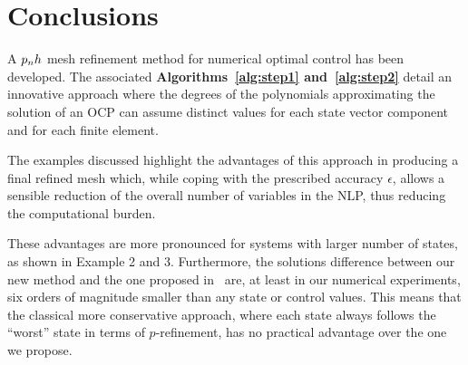 \section*{Conclusions}
A $p_{n}h$ mesh refinement method for numerical optimal control has been developed. The associated {\bf Algorithms~\ref{alg:step1} and~\ref{alg:step2}} detail an innovative approach where the degrees of the polynomials approximating the solution of an OCP can assume distinct values for each state vector component and for each finite element.

The examples discussed highlight the advantages of this approach in producing a final refined mesh which, while coping with the prescribed accuracy $\epsilon$, allows a sensible reduction of the overall number of variables in the NLP, thus reducing the computational burden.

These advantages are more pronounced for systems with larger number of states, as shown in Example 2 and 3.
Furthermore, the solutions difference between our new method and the one proposed in~\cite{Patterson:OCAM:2015} are, at least in our numerical experiments, six orders of magnitude smaller than any state or control values. This means that the classical more conservative approach, where each state always follows the ``worst'' state in terms of $p$-refinement, has no practical advantage over the one we propose.
